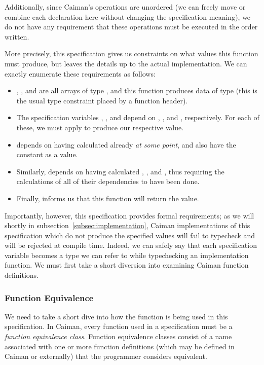 Additionally, since Caiman's operations are unordered (we can freely move or combine each declaration here without changing the specification meaning), we do not have any requirement that these operations must be executed in the order written.

More precisely, this specification gives us constraints on what values this function must produce, but leaves the details up to the actual implementation.  We can exactly enumerate these requirements as follows:
%
\begin{itemize}
\item {}, , and  are all arrays of type , and this function produces data of type  (this is the usual type constraint placed by a function header).
\item The specification variables , , and  depend on , , and , respectively.  For each of these, we must apply  to produce our respective value.
\item {} depends on having calculated  already \textit{at some point}, and also have the constant  as a value.
\item Similarly,  depends on having calculated , , and , thus requiring the calculations of all of their dependencies to have been done.
\item Finally,  informs us that this function will return the  value.
\end{itemize}
%
Importantly, however, this specification provides formal requirements; as we will shortly in subsection~\ref{subsec:implementation}, Caiman implementations of this specification which do not produce the specified values will fail to typecheck and will be rejected at compile time.  Indeed, we can safely say that each specification variable becomes a type we can refer to while typechecking an implementation function.  We must first take a short diversion into examining Caiman function definitions.

\subsubsection{Function Equivalence}
\label{subsec:equivalence}

We need to take a short dive into how the  function is being used in this  specification.  In Caiman, every function used in a specification must be a \textit{function equivalence class}.  Function equivalence classes consist of a name associated with one or more function definitions (which may be defined in Caiman or externally) that the programmer considers equivalent.

